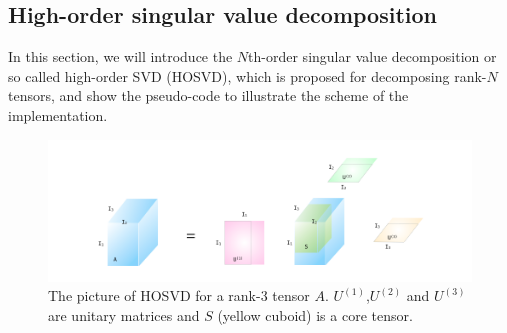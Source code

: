 \subsection{High-order singular value decomposition}
\label{hosvd}
In this section, we will introduce the $N$th-order singular value decomposition or so called high-order SVD (HOSVD), which is proposed for decomposing rank-$N$ tensors, and show the pseudo-code to illustrate the scheme of the implementation.
\begin{figure}[b]
	\centering
	\includegraphics[width=1.00\textwidth]{figures/fig4311.png}
	\caption[The picture of HOSVD for a rank-3 tensor.]{The picture of HOSVD for a rank-3 tensor $A$. $U^{(1)}$,$U^{(2)}$ and $U^{(3)}$ are unitary matrices and $S$ (yellow cuboid) is a core tensor.}
	\label{fig4311}
\end{figure}

